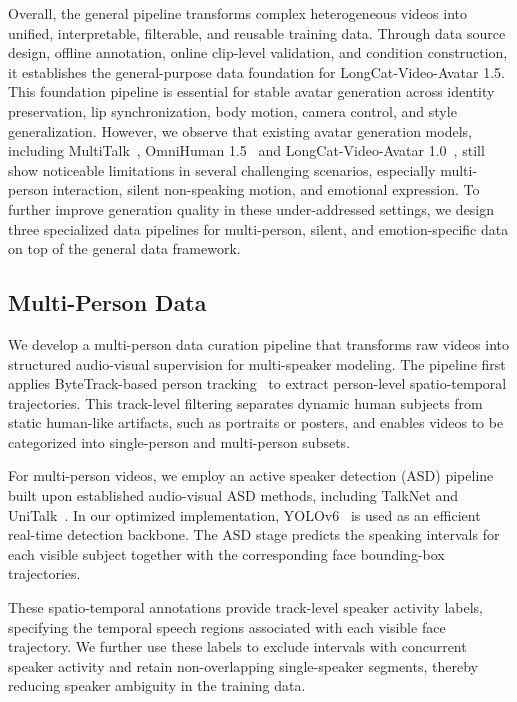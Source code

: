 Overall, the general pipeline transforms complex heterogeneous videos into unified, interpretable, filterable, and reusable training data. Through data source design, offline annotation, online clip-level validation, and condition construction, it establishes the general-purpose data foundation for LongCat-Video-Avatar 1.5. This foundation pipeline is essential for stable avatar generation across identity preservation, lip synchronization, body motion, camera control, and style generalization. However, we observe that existing avatar generation models, including MultiTalk~\cite{kong2025let}, OmniHuman 1.5~\cite{jiang2025omnihuman} and LongCat-Video-Avatar 1.0~\cite{meituanlongcatteam2025longcatvideoavatartechnicalreport}, still show noticeable limitations in several challenging scenarios, especially multi-person interaction, silent non-speaking motion, and emotional expression. To further improve generation quality in these under-addressed settings, we design three specialized data pipelines for multi-person, silent, and emotion-specific data on top of the general data framework.



\subsection{Multi-Person Data}
We develop a multi-person data curation pipeline that transforms raw videos into structured audio-visual supervision for multi-speaker modeling. The pipeline first applies ByteTrack-based person tracking~\cite{zhang2022bytetrack} to extract person-level spatio-temporal trajectories. This track-level filtering separates dynamic human subjects from static human-like artifacts, such as portraits or posters, and enables videos to be categorized into single-person and multi-person subsets.

For multi-person videos, we employ an active speaker detection (ASD) pipeline built upon established audio-visual ASD methods, including TalkNet and UniTalk~\cite{tao2021talknet,nguyen2025unitalk}. In our optimized implementation, YOLOv6~\cite{li2022yolov6} is used as an efficient real-time detection backbone. The ASD stage predicts the speaking intervals for each visible subject together with the corresponding face bounding-box trajectories.

These spatio-temporal annotations provide track-level speaker activity labels, specifying the temporal speech regions associated with each visible face trajectory. We further use these labels to exclude intervals with concurrent speaker activity and retain non-overlapping single-speaker segments, thereby reducing speaker ambiguity in the training data.


